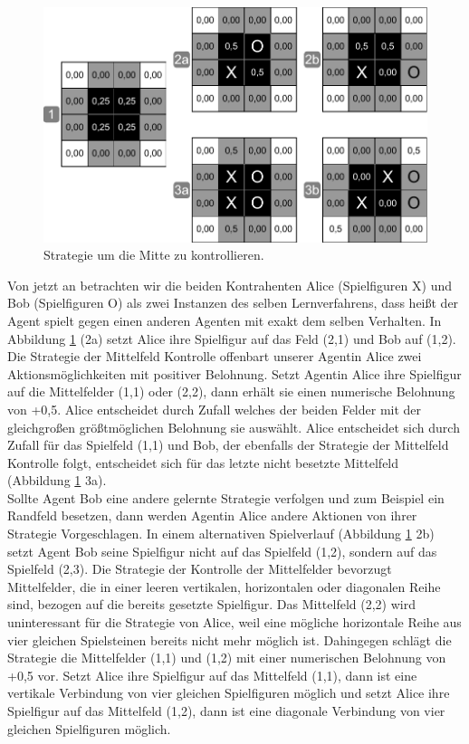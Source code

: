 \begin{figure}[!htbp]
  \centering
  \includegraphics[scale = 0.8]{inhalt/abbildungen/kontrolliere_die_mitte.pdf}
  \caption{Strategie um die Mitte zu kontrollieren.}
  \label{fig:kontrolliere_die_mitte}
\end{figure}

Von jetzt an betrachten wir die beiden Kontrahenten Alice (Spielfiguren X) und Bob (Spielfiguren O) als zwei Instanzen des selben Lernverfahrens, dass heißt der Agent spielt gegen einen anderen Agenten mit exakt dem selben Verhalten.
In Abbildung \ref{fig:kontrolliere_die_mitte} (2a) setzt Alice ihre Spielfigur auf das Feld (2,1) und Bob auf (1,2). Die Strategie der Mittelfeld Kontrolle offenbart unserer Agentin Alice zwei Aktionsmöglichkeiten mit positiver Belohnung. Setzt Agentin Alice ihre Spielfigur auf die Mittelfelder (1,1) oder (2,2), dann erhält sie einen numerische Belohnung von +0,5. Alice entscheidet durch Zufall welches der beiden Felder mit der gleichgroßen größtmöglichen Belohnung sie auswählt. Alice entscheidet sich durch Zufall für das Spielfeld (1,1) und Bob, der ebenfalls der Strategie der Mittelfeld Kontrolle folgt, entscheidet sich für das letzte nicht besetzte Mittelfeld (Abbildung \ref{fig:kontrolliere_die_mitte} 3a).\\

Sollte Agent Bob eine andere gelernte Strategie verfolgen und zum Beispiel ein Randfeld besetzen, dann werden Agentin Alice andere Aktionen von ihrer Strategie Vorgeschlagen. In einem alternativen Spielverlauf (Abbildung \ref{fig:kontrolliere_die_mitte} 2b) setzt Agent Bob seine Spielfigur nicht auf das Spielfeld (1,2), sondern auf das Spielfeld (2,3). Die Strategie der Kontrolle der Mittelfelder bevorzugt Mittelfelder, die in einer leeren vertikalen, horizontalen oder diagonalen Reihe sind, bezogen auf die bereits gesetzte Spielfigur. Das Mittelfeld (2,2) wird uninteressant für die Strategie von Alice, weil eine mögliche horizontale Reihe aus vier gleichen Spielsteinen bereits nicht mehr möglich ist. Dahingegen schlägt die Strategie die Mittelfelder (1,1) und (1,2) mit einer numerischen Belohnung von +0,5 vor. Setzt Alice ihre Spielfigur auf das Mittelfeld (1,1), dann ist eine vertikale Verbindung von vier gleichen Spielfiguren möglich und setzt Alice ihre Spielfigur auf das Mittelfeld (1,2), dann ist eine diagonale Verbindung von vier gleichen Spielfiguren möglich. \\

